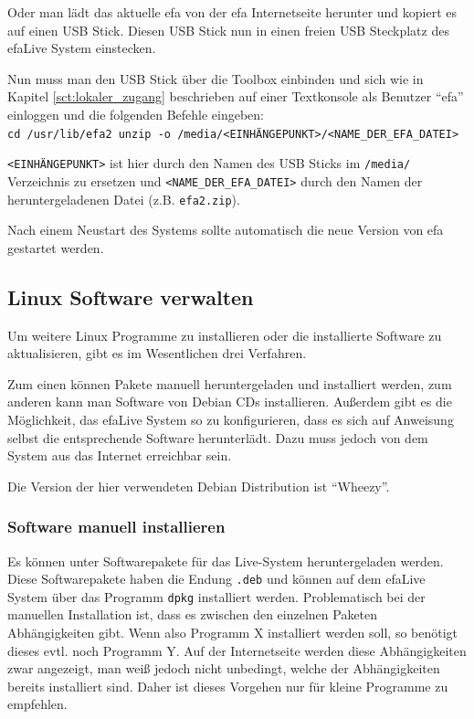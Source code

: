 \documentclass[a4paper,12pt,twoside]{article}
\begin{document}
Oder man lädt das aktuelle efa von der efa Internetseite \cite{EFA1}
herunter und kopiert es auf einen USB Stick. Diesen USB Stick nun in
einen freien USB Steckplatz des efaLive System einstecken. 

Nun muss man den USB Stick über die Toolbox einbinden und sich wie in
Kapitel \ref{sct:lokaler_zugang} beschrieben auf einer Textkonsole als Benutzer
"`efa"' einloggen und die folgenden Befehle eingeben:
\bigskip
\\
\texttt{cd /usr/lib/efa2
unzip -o /media/{\textless}EINHÄNGEPUNKT{\textgreater}/{\textless}NAME\_DER\_EFA\_DATEI{\textgreater}}

\bigskip
\texttt{{\textless}EINHÄNGEPUNKT{\textgreater}} ist hier durch den Namen des USB
Sticks im \texttt{/media/} Verzeichnis zu ersetzen und \texttt{{\textless}NAME\_DER\_EFA\_DATEI{\textgreater}} 
durch den Namen der heruntergeladenen Datei (z.B. \texttt{efa2.zip}).

Nach einem Neustart des Systems sollte automatisch die neue Version von
efa gestartet werden.


\subsection{Linux Software verwalten}
\label{sct:linux_software}
Um weitere Linux Programme zu installieren oder die installierte
Software zu aktualisieren, gibt es im Wesentlichen
drei Verfahren. 

Zum einen können Pakete manuell heruntergeladen und installiert werden,
zum anderen kann man Software von Debian CDs installieren. Außerdem
gibt es die Möglichkeit, das efaLive System so zu konfigurieren, dass
es sich auf Anweisung selbst die entsprechende Software herunterlädt.
Dazu muss jedoch von dem System aus das Internet erreichbar sein.

Die Version der hier verwendeten Debian Distribution ist "`Wheezy"'.


\subsubsection{Software manuell installieren}
\label{sct:software_manuell}
Es können unter \cite{DEB3} Softwarepakete für das Live-System
heruntergeladen werden. Diese Softwarepakete haben die Endung
\texttt{.deb} und können auf dem efaLive System
über das Programm \texttt{dpkg} installiert werden. Problematisch bei der
manuellen Installation ist, dass es zwischen den einzelnen Paketen
Abhängigkeiten gibt. Wenn also Programm X installiert werden soll, so
benötigt dieses evtl. noch Programm Y. Auf der Internetseite werden
diese Abhängigkeiten zwar angezeigt, man weiß jedoch nicht unbedingt,
welche der Abhängigkeiten bereits installiert sind. Daher ist dieses
Vorgehen nur für kleine Programme zu empfehlen.
\end{document}
